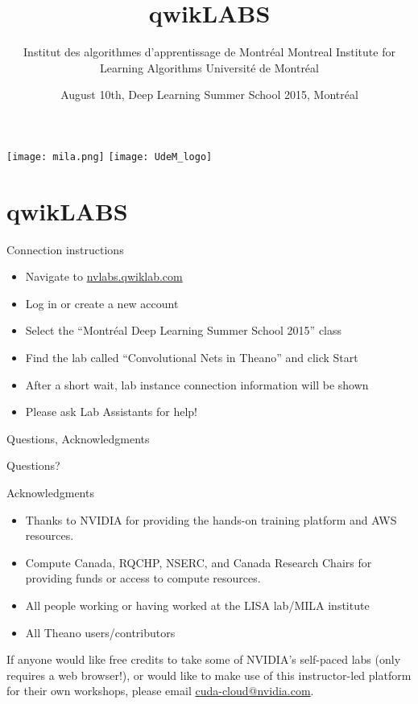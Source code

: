 \documentclass[utf8x,xcolor=pdftex,dvipsnames,table]{beamer}
\title{qwikLABS}
\author{%
\footnotesize
\newline
\newline
Institut des algorithmes d'apprentissage de Montréal \newline
Montreal Institute for Learning Algorithms \newline
Université de Montréal
}
\date{August 10th, Deep Learning Summer School 2015, Montréal}
\begin{document}
\begin{frame}[plain]
 \titlepage
 \vspace{-2em}
 \texttt{[image: mila.png]}
 \hfill
 \texttt{[image: UdeM\_logo]}
\end{frame}

\section{qwikLABS}
\begin{frame}{Connection instructions}
\begin{itemize}
\item Navigate to \url{nvlabs.qwiklab.com}
\item Log in or create a new account
\item Select the ``Montréal Deep Learning Summer School 2015'' class
\item Find the lab called ``Convolutional Nets in Theano'' and click Start
\item After a short wait, lab instance connection information will be shown
\item Please ask Lab Assistants for help!
\end{itemize}
\end{frame}

\begin{frame}{Questions, Acknowledgments}
\huge
\begin{center}
Questions?
\end{center}
\Large
Acknowledgments
\normalsize
\begin{itemize}
\item Thanks to NVIDIA for providing the hands-on training platform and AWS resources.
\item Compute Canada, RQCHP, NSERC, and Canada Research Chairs for providing funds or access to compute resources.
\item All people working or having worked at the LISA lab/MILA institute
\item All Theano users/contributors
\end{itemize}

\begin{small}
If anyone would like free credits to take some of NVIDIA's self-paced labs (only requires a web browser!), or
would like to make use of this instructor-led platform for their own workshops, please email \url{cuda-cloud@nvidia.com}.
\end{small}
\end{frame}
\end{document}
